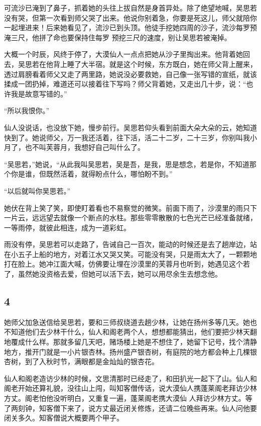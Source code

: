 可流沙已淹到了鼻子，抓着她的头往上拔自然是身首异处。除了绝望地喊，吴思若没有哭，但第一次看到师父哭了出来。他说你别着急，你要是死这儿，师父就陪你一起埋进来！后来她看见了，流沙已到头顶。他徒手挖她四周的沙子，流沙每罗预淹三尺，他拼了命也要保持住每罗
预挖三尺的速度，别让吴思若被淹掉。

大概一个时辰，风终于停了，大漠仙人一点点把她从沙子里掏出来。他背着她回去，吴思若在他背上睡了大半宿。就是这个时候，东方既白，她在师父背上醒来，透过肩膀看着师父又走了两里路，她说没必要救她，自己像一张写错的宣纸，就该揉成一团扔掉，难道还可以接着往下写吗？师父背着她，又走出几十步，说：“也许我是故意写错的。”

“所以我恨你。”

仙人没说话，也没放下她，慢步前行。吴思若仰头看到前面大朵大朵的云，她知道快到了。她说师父，万一我还活着，往下活，活二十二岁，二十三岁，你别叫我小月了，也不叫芙蓉月，我想好自己叫什么了。

“吴思若，”她说，“从此我叫吴思若，吴是吾，是我，思是想念，若是你，不知道那个你是谁，但既然活着，就得盼点什么，哪怕盼不到。”

“以后就叫你吴思若。”

她伏在背上笑了笑，即使盯着看也不易察觉的微笑。前面下雨了，沙漠里的雨只下一片云，远远望去就像一个断点的水柱。那些零零散散的七色光芒已经准备就绪，一等雨停，就彼此相连，成为一道彩虹。

雨没有停，吴思若可以走路了，告诫自己一百次，能动的时候还是去了趟岸边，站在小五子上船的地方，对着江水又哭又笑。可能没有哭，只是雨太大了，一颗颗地打在脸上。她冲江面大喊，仿佛要让埋在沙漠里的芙蓉月也听到，她遇见这个若了，虽然她没资格去爱，但她可以活下去，她可以用尽余生去想念他。
\newline

{\centering\subsection{4}}

她师父加急送信给吴思若，要和三师叔绕道去趟少林，让她在扬州多等几天。她也不知道他们去少林干什么，仙人和阁老两个人，想想都能猜出，他们要把少林天翻地覆成什么样。那就多留几天吧，赌场楼上她是不想住了，她留下记号，找个清静地方，推开门就是一小片银杏林。扬州盛产银杏树，有庭院的地方都会种上几棵银杏树，到了入秋时节，满眼都是金灿灿的银杏花。

仙人和阁老造访少林的时候，文思清那时已经走了，和田扒光一起下了山。仙人和阁老开始还算礼貌，没往山上闯，叫知客僧传话，说大漠仙人携蓬莱阁老拜访少林方丈。阁老怕他没听明白，又重复一遍，蓬莱阁老携大漠仙
人拜访少林方丈。等了两刻钟，知客僧下来了，说方丈最近闭关修炼，还请二位晚些再来。仙人问他要闭关多久。知客僧说大概要两个甲子。

